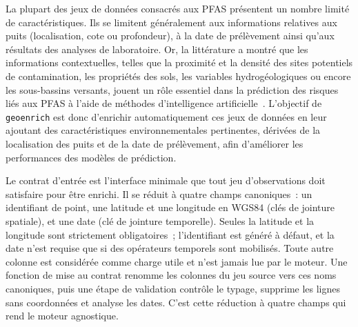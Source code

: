\label{sec:geoenrich-motivation}


La plupart des jeux de donn\'ees consacr\'es aux PFAS pr\'esentent un nombre limit\'e de caract\'eristiques. Ils se limitent g\'en\'eralement aux informations relatives aux puits (localisation, cote ou profondeur), \`a la date de pr\'el\`evement ainsi qu'aux r\'esultats des analyses de laboratoire. Or, la litt\'erature a montr\'e que les informations contextuelles, telles que la proximit\'e et la densit\'e des sites potentiels de contamination, les propri\'et\'es des sols, les variables hydrog\'eologiques ou encore les sous-bassins versants, jouent un r\^ole essentiel dans la pr\'ediction des risques li\'es aux PFAS \`a l'aide de m\'ethodes d'intelligence artificielle~\cite{dong2024pfas,guelfo2021pfas}. L'objectif de \texttt{geoenrich} est donc d'enrichir automatiquement ces jeux de donn\'ees en leur ajoutant des caract\'eristiques environnementales pertinentes, d\'eriv\'ees de la localisation des puits et de la date de pr\'el\`evement, afin d'am\'eliorer les performances des mod\`eles de pr\'ediction.

\label{sec:geoenrich-contrat}

Le contrat d'entr\'ee est l'interface minimale que tout jeu d'observations doit satisfaire pour \^etre enrichi. Il se r\'eduit \`a quatre champs canoniques~: un identifiant de point, une latitude et une longitude en WGS84 (cl\'es de jointure spatiale), et une date (cl\'e de jointure temporelle). Seules la latitude et la longitude sont strictement obligatoires~; l'identifiant est g\'en\'er\'e \`a d\'efaut, et la date n'est requise que si des op\'erateurs temporels sont mobilis\'es. Toute autre colonne est consid\'er\'ee comme charge utile et n'est jamais lue par le moteur. Une fonction de mise au contrat renomme les colonnes du jeu source vers ces noms canoniques, puis une \'etape de validation contr\^ole le typage, supprime les lignes sans coordonn\'ees et analyse les dates. C'est cette r\'eduction \`a quatre champs qui rend le moteur agnostique.


